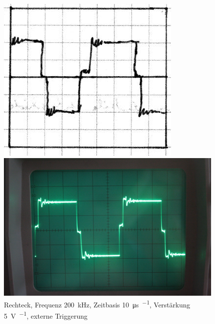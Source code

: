 \begin{figure}
	\centering
	\begin{minipage}{.45\linewidth}
	\includegraphics[width=\linewidth]{Skizzen/IMG_0773-1500.jpg}
	\end{minipage}
	\hfill
	\begin{minipage}{.45\linewidth}
	\includegraphics[width=\linewidth]{Fotos/IMG_0773-1500.jpg}
	\end{minipage}
	\caption{%
		Rechteck, Frequenz \SI{200}{\kilo\hertz},
		Zeitbasis \SI{10}{\micro\second\per\division},
		Verstärkung \SI{5}{\volt\per\division},
		externe Triggerung
	}
	\label{fig:0773}
\end{figure}

